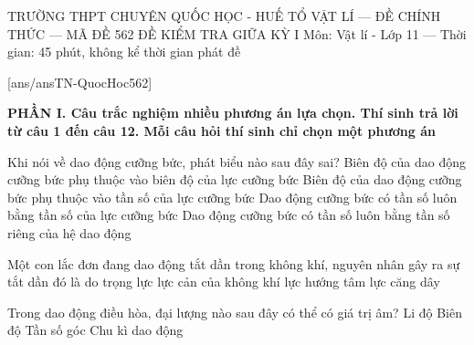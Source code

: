 \def\toanlop{11}
\def\thoigian{45}
\def\namhoc{2025 - 2026}
\begin{dethi}
	{TRƯỜNG THPT CHUYÊN QUỐC HỌC - HUẾ}
	{TỔ VẬT LÍ --- ĐỀ CHÍNH THỨC --- MÃ ĐỀ 562}
	{ĐỀ KIỂM TRA GIỮA KỲ I}
	{Môn: Vật lí - Lớp 11 --- Thời gian: 45 phút, không kể thời gian phát đề}
\end{dethi}

[ans/ansTN-QuocHoc562]

\noindent \textbf{PHẦN I. Câu trắc nghiệm nhiều phương án lựa chọn. Thí sinh trả lời từ câu 1 đến câu 12. Mỗi câu hỏi thí sinh chỉ chọn một phương án}
\vspace{0.2cm}

\begin{ex}%
	Khi nói về dao động cưỡng bức, phát biểu nào sau đây sai?
	\choice
	{Biên độ của dao động cưỡng bức phụ thuộc vào biên độ của lực cưỡng bức}
	{Biên độ của dao động cưỡng bức phụ thuộc vào tần số của lực cưỡng bức}
	{Dao động cưỡng bức có tần số luôn bằng tần số của lực cưỡng bức}
	{\True Dao động cưỡng bức có tần số luôn bằng tần số riêng của hệ dao động}
\end{ex}

\begin{ex}%
	Một con lắc đơn đang dao động tắt dần trong không khí, nguyên nhân gây ra sự tắt dần đó là do
	\choice
	{trọng lực}
	{\True lực cản của không khí}
	{lực hướng tâm}
	{lực căng dây}
\end{ex}

\begin{ex}%
	Trong dao động điều hòa, đại lượng nào sau đây có thể có giá trị âm?
	\choice
	{\True Li độ}
	{Biên độ}
	{Tần số góc}
	{Chu kì dao động}
\end{ex}

